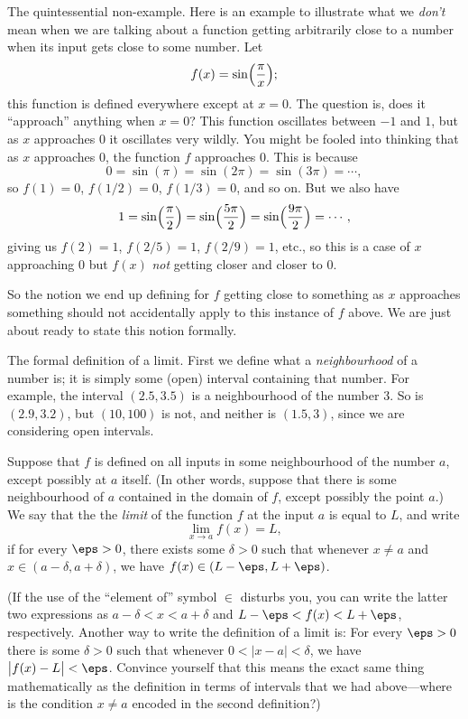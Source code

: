 \medskip\boldlabel The quintessential non-example.
Here is an example to illustrate what we {\it don't} mean when we are talking about a function getting
arbitrarily close to a number when its input gets close to some number. Let
$$f(x) = \sin\Bigl({\pi\over x}\Bigr);$$
this function is defined everywhere except at $x=0$. The question is, does it ``approach'' anything
when $x=0$?
This function oscillates between $-1$ and $1$, but as $x$ approaches $0$ it oscillates very wildly.
You might be fooled into thinking that as $x$ approaches $0$, the function $f$ approaches $0$.
This is because
$$0 = \sin(\pi) = \sin(2\pi) = \sin(3\pi) = \cdots,$$
so
$f(1) = 0$, $f(1/2) = 0$, $f(1/3) = 0$, and so on.
But we also have
$$1 = \sin\Bigl({\pi\over 2}\Bigr) = \sin\Bigl({5\pi\over 2}\Bigr) = \sin\Bigl({9\pi\over 2}\Bigr) = \cdots,$$
giving us
$f(2) = 1$, $f(2/5) = 1$, $f(2/9) = 1$, etc., so this is a case of $x$ approaching $0$ but
$f(x)$ {\it not} getting closer and closer to $0$.

So the notion we end up defining for $f$ getting close to something as $x$ approaches something should
not accidentally apply to this instance of $f$ above. We are just about ready to state this notion formally.

\medskip\boldlabel The formal definition of a limit.
First we define what a {\it neighbourhood} of a number
is; it is simply some (open) interval containing that number. For example, the interval $(2.5, 3.5)$
is a neighbourhood of the number $3$. So is $(2.9, 3.2)$, but $(10,100)$ is not, and neither is $(1.5, 3)$,
since we are considering open intervals.

Suppose that $f$ is defined on all inputs in some neighbourhood of the number $a$, except possibly at $a$ itself.
(In other words, suppose that there is some neighbourhood of $a$ contained in the domain of $f$, except
possibly the point $a$.)
We say that the the {\it limit} of the function $f$ at the input $a$ is equal to $L$, and write
$$\lim_{x\to a} f(x) = L,$$
if for every $\eps > 0$, there exists some $\delta > 0$ such that whenever $x\ne a$ and
$x\in (a-\delta, a+\delta)$, we have $f(x) \in (L-\eps, L+\eps)$.

(If the use of the ``element of'' symbol $\in$
disturbs you,
you can write the latter two expressions as $a-\delta < x < a+\delta$ and $L-\eps < f(x) < L+\eps$,
respectively. Another way to write the definition of a limit is: For every $\eps >0$ there is some
$\delta >0$ such that whenever $0< |x-a| < \delta$, we have
$\bigl| f(x) - L\bigr| < \eps$. Convince yourself that this means the exact same thing mathematically as
the definition in terms of intervals that we had above---where
is the condition $x\ne a$ encoded in the second definition?)

